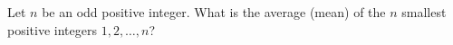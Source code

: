 Let $n$ be an odd positive integer. What is the average (mean) of the $n$ smallest positive integers $1,2,\dots,n$?
